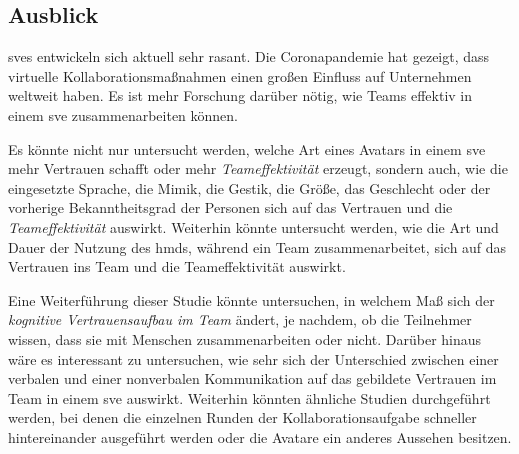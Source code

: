\documentclass[a4paper,11pt]{article}%
\renewcommand{\\}{\vspace*{0.5\baselineskip} \newline}
\begin{document}
{{\subsection{Ausblick}
\ac{sve}s entwickeln sich aktuell sehr rasant. Die Coronapandemie hat gezeigt, dass virtuelle Kollaborationsmaßnahmen einen großen Einfluss auf Unternehmen weltweit haben. Es ist mehr Forschung darüber nötig, wie Teams effektiv in einem \ac{sve} zusammenarbeiten können.

Es könnte nicht nur untersucht werden, welche Art eines Avatars in einem \ac{sve} mehr Vertrauen schafft oder mehr \textit{Teameffektivität} erzeugt, sondern auch, wie die eingesetzte Sprache, die Mimik, die Gestik, die Größe, das Geschlecht oder der vorherige Bekanntheitsgrad der Personen sich auf das Vertrauen und die \textit{Teameffektivität} auswirkt.
Weiterhin könnte untersucht werden, wie die Art und Dauer der Nutzung des \ac{hmd}s, während ein Team zusammenarbeitet, sich auf das Vertrauen ins Team und die Teameffektivität auswirkt.

Eine Weiterführung dieser Studie könnte untersuchen, in welchem Maß sich der \textit{kognitive Vertrauensaufbau im Team} ändert, je nachdem, ob die Teilnehmer wissen, dass sie mit Menschen zusammenarbeiten oder nicht. Darüber hinaus wäre es interessant zu untersuchen, wie sehr sich der Unterschied zwischen einer verbalen und einer nonverbalen Kommunikation auf das gebildete Vertrauen im Team in einem \ac{sve} auswirkt.  
Weiterhin könnten ähnliche Studien durchgeführt werden, bei denen die einzelnen Runden der Kollaborationsaufgabe schneller hintereinander ausgeführt werden oder die Avatare ein anderes Aussehen besitzen.
%
%
%
\clearpage
\newpage
}}
\end{document}
